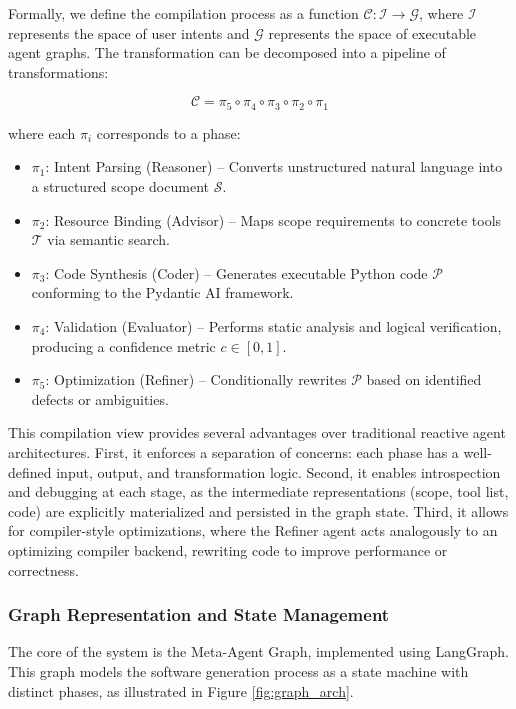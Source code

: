\documentclass[lettersize,journal]{IEEEtran}
\begin{document}
Formally, we define the compilation process as a function $\mathcal{C}: \mathcal{I} \rightarrow \mathcal{G}$, where $\mathcal{I}$ represents the space of user intents and $\mathcal{G}$ represents the space of executable agent graphs. The transformation can be decomposed into a pipeline of transformations:

\begin{equation}
\mathcal{C} = \pi_5 \circ \pi_4 \circ \pi_3 \circ \pi_2 \circ \pi_1
\end{equation}

where each $\pi_i$ corresponds to a phase:
\begin{itemize}
    \item $\pi_1$: Intent Parsing (Reasoner) -- Converts unstructured natural language into a structured scope document $\mathcal{S}$.
    \item $\pi_2$: Resource Binding (Advisor) -- Maps scope requirements to concrete tools $\mathcal{T}$ via semantic search.
    \item $\pi_3$: Code Synthesis (Coder) -- Generates executable Python code $\mathcal{P}$ conforming to the Pydantic AI framework.
    \item $\pi_4$: Validation (Evaluator) -- Performs static analysis and logical verification, producing a confidence metric $c \in [0,1]$.
    \item $\pi_5$: Optimization (Refiner) -- Conditionally rewrites $\mathcal{P}$ based on identified defects or ambiguities.
\end{itemize}

This compilation view provides several advantages over traditional reactive agent architectures. First, it enforces a separation of concerns: each phase has a well-defined input, output, and transformation logic. Second, it enables introspection and debugging at each stage, as the intermediate representations (scope, tool list, code) are explicitly materialized and persisted in the graph state. Third, it allows for compiler-style optimizations, where the Refiner agent acts analogously to an optimizing compiler backend, rewriting code to improve performance or correctness.

\subsubsection{Graph Representation and State Management}
The core of the system is the Meta-Agent Graph, implemented using LangGraph. This graph models the software generation process as a state machine with distinct phases, as illustrated in Figure \ref{fig:graph_arch}.
\end{document}
